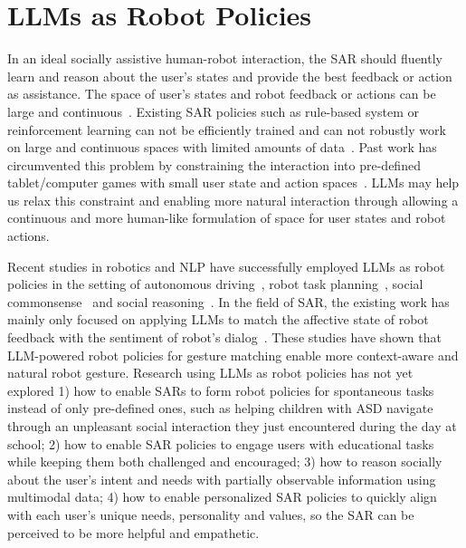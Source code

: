 \documentclass[
twocolumn,
]{ceurart}
\begin{document}
\section{LLMs as Robot Policies}

In an ideal socially assistive human-robot interaction, the SAR should fluently learn and reason about the user's states and provide the best feedback or action as assistance. The space of user's states and robot feedback or actions can be large and continuous~\cite{clabaugh2019escaping}. Existing SAR policies such as rule-based system or reinforcement learning can not be efficiently trained and can not robustly work on large and continuous spaces with limited amounts of data~\cite{akalin2021reinforcement}. Past work has circumvented this problem by constraining the interaction into pre-defined tablet/computer games with small user state and action spaces~\cite{clabaugh2019escaping}. LLMs may help us relax this constraint and enabling more natural interaction through allowing a continuous and more human-like formulation of space for user states and robot actions.

Recent studies in robotics and NLP have successfully employed LLMs as robot policies in the setting of autonomous driving~\cite{cui2024survey}, robot task planning~\cite{singh2023progprompt, saycan-ahn2022i}, social commonsense~\cite{sap-etal-2019-social} and social reasoning~\cite{gandhi2023understanding}. In the field of SAR, the existing work has mainly only focused on applying LLMs to match the affective state of robot feedback with the sentiment of robot's dialog~\cite{lee2023developing, mishra2023real, lim2023sign}. These studies have shown that LLM-powered robot policies for gesture matching enable more context-aware and natural robot gesture. Research using LLMs as robot policies has not yet explored 1) how to enable SARs to form robot policies for spontaneous tasks instead of only pre-defined ones, such as helping children with ASD navigate through an unpleasant social interaction they just encountered during the day at school; 2) how to enable SAR policies to engage users with educational tasks while keeping them both challenged and encouraged; 3) how to reason socially about the user's intent and needs with partially observable information using multimodal data; 4) how to enable personalized SAR policies to quickly align with each user's unique needs, personality and values, so the SAR can be perceived to be more helpful and empathetic.


\end{document}
